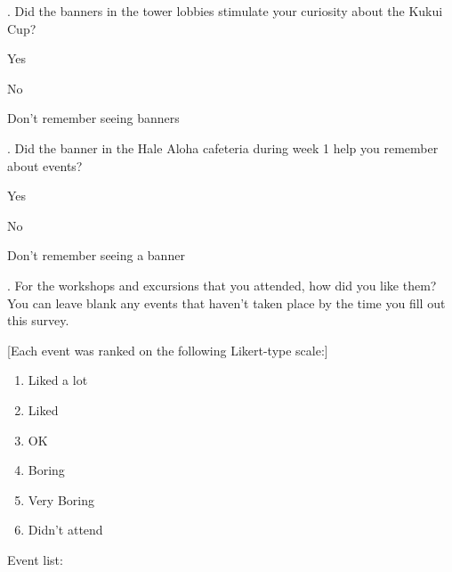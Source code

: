 \vspace{5 mm}
. Did the banners in the tower lobbies stimulate your curiosity about the Kukui Cup?

\begin{radiobutton}
	\item Yes
	\item No
	\item Don't remember seeing banners
\end{radiobutton}

\vspace{5 mm}
. Did the banner in the Hale Aloha cafeteria during week 1 help you remember about events?

\begin{radiobutton}
	\item Yes
	\item No
	\item Don't remember seeing a banner
\end{radiobutton}

\vspace{5 mm}
. For the workshops and excursions that you attended, how did you like them? You can leave blank any events that haven't taken place by the time you fill out this survey.

[Each event was ranked on the following Likert-type scale:]

\begin{enumerate}
	\item Liked a lot
	\item Liked 
	\item OK 
	\item Boring
	\item Very Boring
	\item Didn't attend
\end{enumerate}

\noindent
Event list:

